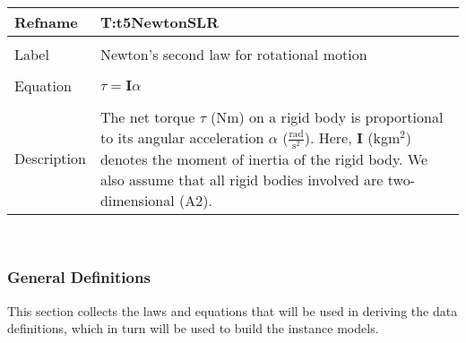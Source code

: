 \documentclass[12pt]{article}
\begin{document}
~\newline
\noindent \begin{minipage}{\textwidth}
\begin{tabular}{p{} p{}}
\toprule \textbf{Refname} & \textbf{T:t5NewtonSLR}
\label{T:t5NewtonSLR}
\\ \midrule \\
Label & Newton's second law for rotational motion
\\ \midrule \\
Equation & $\tau{}=\mathbf{I}\alpha{}$
\\ \midrule \\
Description & The net torque $\tau{}$ (Nm) on a rigid body is proportional to its angular acceleration $\alpha{}$ ($\frac{\text{rad}}{\text{s}^{2}}$). Here, $\mathbf{I}$ (kg$\text{m}^{2}$) denotes the moment of inertia of the rigid body. We also assume that all rigid bodies involved are two-dimensional (A2).
\\ \bottomrule \end{tabular}
\end{minipage}\\
\subsubsection{General Definitions}
\label{Sec:GeneDefi}
This section collects the laws and equations that will be used in deriving the data definitions, which in turn will be used to build the instance models.
\end{document}
